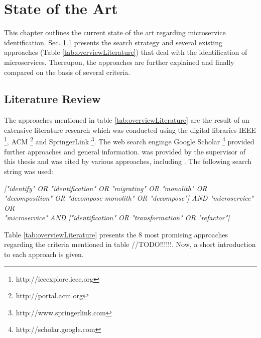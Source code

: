 

\chapter{State of the Art}
\label{ch:StateOfTheArt}
This chapter outlines the current state of the art regarding microservice identification.  Sec. \ref{sec:StateOfTheArt:LiteratureReview} presents the search strategy and several existing approaches (Table \ref{tab:overviewLiterature}) that deal with the identification of microservices. Thereupon, the approaches are further explained and finally compared on the basis of several criteria.

\section{Literature Review}
\label{sec:StateOfTheArt:LiteratureReview}
The approaches mentioned in table \ref{tab:overviewLiterature} are the result of an extensive literature research which was conducted using the digital libraries IEEE \footnote{http://ieeexplore.ieee.org }, ACM \footnote{http://portal.acm.org} and SpringerLink \footnote{http://www.springerlink.com }. The web search enginge Google Scholar \footnote{http://scholar.google.com} provided further approaches and general information. \cite{FunctionalDecompositionHeinrich} was provided by the supervisor of this thesis and \cite{ServiceCutter} was cited by various approaches, including \cite{interfaceAnalysisBaresi}. The following search string was used:

\begin{centering}
{\itshape
   ["identify" OR "identification" OR "migrating" OR "monolith" OR "decomposition" OR "decompose monolith"
  	OR "decompose"] AND  "microservice"  \\
  	   OR \\  "microservice"  AND ["identification" OR "transformation" OR "refactor"]
}
 
   
\end{centering}

\noindent
Table \ref{tab:overviewLiterature} presents the 8 most promising approaches regarding the criteria mentioned in table //TODO!!!!!!. Now, a short introduction to each approach is given.




